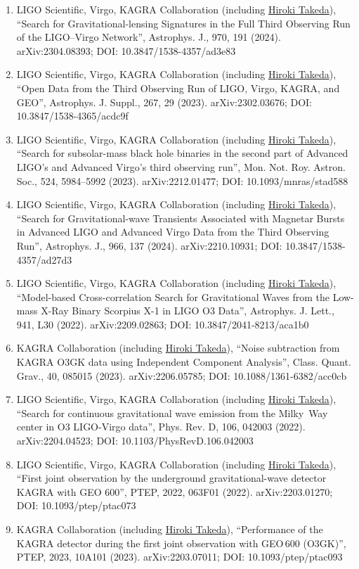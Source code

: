 \documentclass[uplatex, 12pt]{article}
\begin{document}
\begin{enumerate}
\item LIGO Scientific, Virgo, KAGRA Collaboration (including \uline{Hiroki Takeda}), “Search for Gravitational-lensing Signatures in the Full Third Observing Run of the LIGO–Virgo Network”, Astrophys. J., 970, 191 (2024). arXiv:2304.08393; DOI: 10.3847/1538-4357/ad3e83
\item LIGO Scientific, Virgo, KAGRA Collaboration (including \uline{Hiroki Takeda}), “Open Data from the Third Observing Run of LIGO, Virgo, KAGRA, and GEO”, Astrophys. J. Suppl., 267, 29 (2023). arXiv:2302.03676; DOI: 10.3847/1538-4365/acdc9f
\item LIGO Scientific, Virgo, KAGRA Collaboration (including \uline{Hiroki Takeda}), “Search for subsolar-mass black hole binaries in the second part of Advanced LIGO's and Advanced Virgo's third observing run”, Mon. Not. Roy. Astron. Soc., 524, 5984--5992 (2023). arXiv:2212.01477; DOI: 10.1093/mnras/stad588
\item LIGO Scientific, Virgo, KAGRA Collaboration (including \uline{Hiroki Takeda}), “Search for Gravitational-wave Transients Associated with Magnetar Bursts in Advanced LIGO and Advanced Virgo Data from the Third Observing Run”, Astrophys. J., 966, 137 (2024). arXiv:2210.10931; DOI: 10.3847/1538-4357/ad27d3
\item LIGO Scientific, Virgo, KAGRA Collaboration (including \uline{Hiroki Takeda}), “Model-based Cross-correlation Search for Gravitational Waves from the Low-mass X-Ray Binary Scorpius X-1 in LIGO O3 Data”, Astrophys. J. Lett., 941, L30 (2022). arXiv:2209.02863; DOI: 10.3847/2041-8213/aca1b0
\item KAGRA Collaboration (including \uline{Hiroki Takeda}), “Noise subtraction from KAGRA O3GK data using Independent Component Analysis”, Class. Quant. Grav., 40, 085015 (2023). arXiv:2206.05785; DOI: 10.1088/1361-6382/acc0cb
\item LIGO Scientific, Virgo, KAGRA Collaboration (including \uline{Hiroki Takeda}), “Search for continuous gravitational wave emission from the Milky~Way center in O3 LIGO-Virgo data”, Phys. Rev. D, 106, 042003 (2022). arXiv:2204.04523; DOI: 10.1103/PhysRevD.106.042003
\item LIGO Scientific, Virgo, KAGRA Collaboration (including \uline{Hiroki Takeda}), “First joint observation by the underground gravitational-wave detector KAGRA with GEO 600”, PTEP, 2022, 063F01 (2022). arXiv:2203.01270; DOI: 10.1093/ptep/ptac073
\item KAGRA Collaboration (including \uline{Hiroki Takeda}), “Performance of the KAGRA detector during the first joint observation with GEO\,600 (O3GK)”, PTEP, 2023, 10A101 (2023). arXiv:2203.07011; DOI: 10.1093/ptep/ptac093

\end{enumerate}
\end{document}
